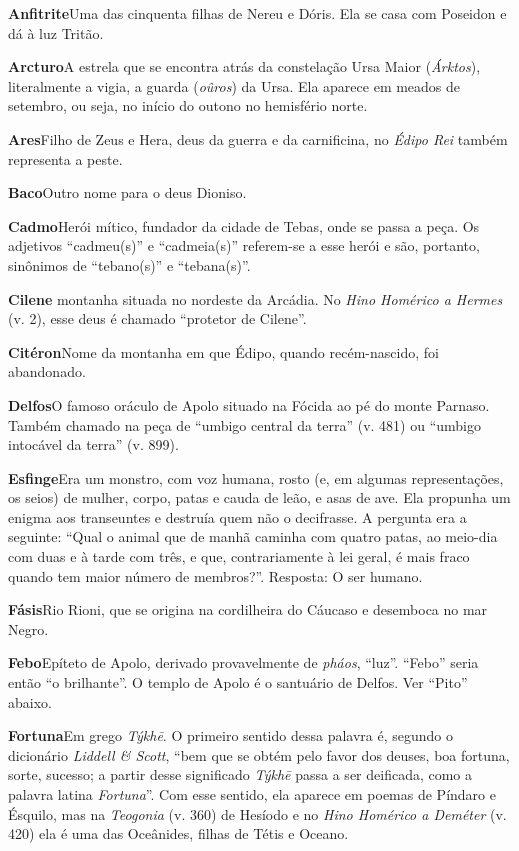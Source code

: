\textbf{Anfitrite}\quad Uma das cinquenta filhas de Nereu e Dóris. Ela se
casa com Poseidon e dá à luz Tritão.

\textbf{Arcturo}\quad A estrela que se encontra atrás da constelação Ursa
Maior (\emph{Árktos}), literalmente a vigia, a guarda (\emph{oûros}) da
Ursa. Ela aparece em meados de setembro, ou seja, no início do outono no
hemisfério norte.

\textbf{Ares}\quad Filho de Zeus e Hera, deus da guerra e da carnificina,
no \emph{Édipo Rei} também representa a peste.

\textbf{Baco}\quad Outro nome para o deus Dioniso.

\textbf{Cadmo}\quad Herói mítico, fundador da cidade de Tebas, onde se
passa a peça. Os adjetivos ``cadmeu(s)'' e ``cadmeia(s)'' referem-se a
esse herói e são, portanto, sinônimos de ``tebano(s)'' e ``tebana(s)''.

\textbf{Cilene\quad} montanha situada no nordeste da Arcádia. No
\emph{Hino Homérico a Hermes} (v. 2), esse deus é chamado ``protetor de
Cilene''.

\textbf{Citéron}\quad Nome da montanha em que Édipo, quando
recém-nascido, foi abandonado.

\textbf{Delfos}\quad O famoso oráculo de Apolo situado na Fócida ao pé do
monte Parnaso. Também chamado na peça de ``umbigo central da terra'' (v.
481) ou ``umbigo intocável da terra'' (v. 899).

\textbf{Esfinge}\quad Era um monstro, com voz humana, rosto (e, em
algumas representações, os seios) de mulher, corpo, patas e cauda de
leão, e asas de ave. Ela propunha um enigma aos transeuntes e destruía
quem não o decifrasse. A pergunta era a seguinte: ``Qual o animal que de
manhã caminha com quatro patas, ao meio-dia com duas e à tarde com três,
e que, contrariamente à lei geral, é mais fraco quando tem maior número
de membros?''. Resposta: O ser humano.

\textbf{Fásis}\quad Rio Rioni, que se origina na cordilheira do Cáucaso
e desemboca no mar Negro.

\textbf{Febo}\quad Epíteto de Apolo, derivado provavelmente de
\emph{pháos}, ``luz''. ``Febo'' seria então ``o brilhante''. O templo de
Apolo é o santuário de Delfos. Ver ``Pito'' abaixo.

\textbf{Fortuna}\quad Em grego \emph{Týkhē}. O primeiro sentido dessa
palavra é, segundo o dicionário \emph{Liddell \& Scott}, ``bem que se
obtém pelo favor dos deuses, boa fortuna, sorte, sucesso; a partir desse
significado \emph{Týkhē} passa a ser deificada, como a palavra latina
\emph{Fortuna}''. Com esse sentido, ela aparece em poemas de Píndaro e
Ésquilo, mas na \emph{Teogonia} (v. 360) de Hesíodo e no \emph{Hino
Homérico a Deméter} (v. 420) ela é uma das Oceânides, filhas de Tétis e
Oceano.

